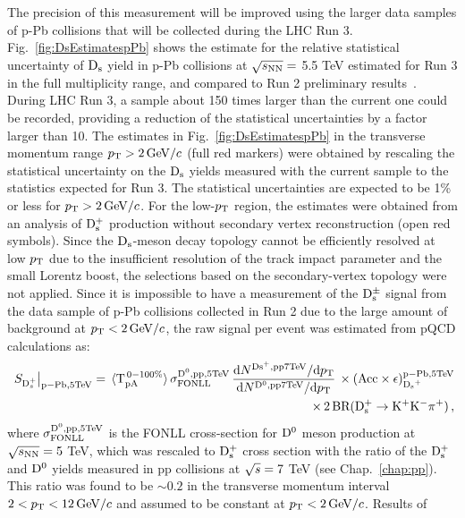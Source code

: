 The precision of this measurement will be improved using the 
larger data samples of p-Pb collisions that will be collected during the LHC Run 3.
Fig.~\ref{fig:DsEstimatespPb} shows the estimate for the relative statistical uncertainty of 
${\rm D_s}$ yield in p-Pb collisions at $\sqrt{s_{\rm NN}}=$ 5.5 TeV estimated for Run 3 in the full multiplicity range, 
and compared to Run 2 preliminary results~\cite{ALICE-PUBLIC-2017-008}. 
During LHC Run 3, a sample about 150 times larger than the current one could be recorded, 
providing a reduction of the statistical uncertainties by a factor larger than 10. 
The estimates in Fig.~\ref{fig:DsEstimatespPb} in the transverse momentum range 
$p_{\rm T} > 2 \, \mathrm{GeV}/c$ (full red markers) were obtained by rescaling the statistical 
uncertainty on the ${\rm D_s}$ yields measured with the current sample to the statistics expected for Run 3.
The statistical uncertainties are expected to be 1\% or less for $p_{\rm T}>2\,\mathrm{GeV}/c$.
For the low-$p_{\rm T}$ region, the estimates were obtained from an analysis of ${\rm D_s^+}$ production without secondary vertex
reconstruction (open red symbols). Since the ${\rm D_s}$-meson decay topology cannot be efficiently resolved at low $p_{\rm T}$ due to the 
insufficient resolution of the track impact parameter and the small Lorentz boost, the selections
based on the secondary-vertex topology were not applied.
Since it is impossible to have a measurement of the ${\rm D_s^{\pm}}$ signal from the data sample of p-Pb collisions collected in Run 2 
due to the large amount of background at $p_{\rm T}<2\,\mathrm{GeV}/c$, the raw signal per event was estimated from pQCD calculations as:
\begin{equation}
\begin{split}
\label{eq:sigStime}\
S_{{\rm D}_{s}^+}\big|_{\rm p-Pb, 5 TeV} = \, \langle {\rm T}_{\rm pA}^{\rm \,0-100\%}\rangle\,\sigma_{\rm FONLL}^{\rm{ D}^{\rm 0},pp, 5 TeV} \,\frac{{\rm d}N^{\rm{ D}{\rm s}^+,pp 7 TeV}/{\rm d}p_{\rm T}}{{\rm d}N^{\rm{ D}^{\rm 0}, pp 7 TeV}/{\rm d}p_{\rm T}}\, \times ({\rm Acc\times \epsilon})_{{\rm D_s}^+}^{\rm p-Pb, 5 TeV}\\
\times \,2\,{\rm BR({\rm D^{+}_\mathrm{s}\to K^+ K^-\pi^+})}\, ,
\end{split}
\end{equation}
where $\sigma_{\rm FONLL}^{\rm{ D}^{ 0},pp, 5 TeV}$ is the FONLL cross-section for ${\rm D^0}$ meson
production at $\sqrt{s_{\rm NN}}=5$ TeV, which was rescaled to ${\rm D_s^+}$ cross section with the ratio of the ${\rm D_s^+}$ and ${\rm D^0}$ yields measured 
in pp collisions at $\sqrt{s}=7$ TeV (see Chap.~\ref{chap:pp}). This ratio was found to be $\sim 0.2$  in the transverse momentum interval 
$2 <p_{\rm T} <12 \, \mathrm{GeV}/c$ and assumed to be constant at $p_{\rm T}<2\,\mathrm{GeV}/c$. Results of 
